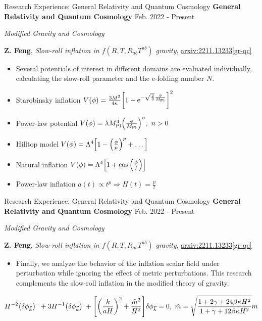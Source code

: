 \documentclass[9pt,aspectratio=169,hyperref=colorlinks]{beamer}
\begin{document}
\begin{frame}{Research Experience: General Relativity and Quantum Cosmology}
    \textbf{General Relativity and Quantum Cosmology} \hfill Feb. 2022 - Present

    \smallskip \quad \textit{Modified Gravity and Cosmology}

    \textbf{Z. Feng}, \textit{Slow-roll inflation in $f\left(R, T, R_{ab}T^{ab}\right)$ gravity}, \href{https://arxiv.org/abs/2211.13233}{arxiv:2211.13233[gr-qc]}

    \begin{itemize}
        \item Several potentials of interest in different domains are evaluated individually, calculating the slow-roll parameter and the e-folding number $N$.
    \end{itemize}

    \begin{itemize}
        \item Starobinsky inflation $V(\phi) = \frac{3 M^2}{4 \kappa} \qty[1 - \mathrm{e}^{- \sqrt{\frac{2}{3}} \frac{\phi}{M_{\text{Pl}}}}]^2$
        \item Power-law potential $V(\phi) = \lambda M_{\text{Pl}}^4 \qty(\frac{\phi}{M_{\text{Pl}}})^n,\ n > 0$
        \item Hilltop model $V(\phi) = \Lambda^4 \qty[1 - \qty(\frac{\phi}{\mu})^p + \dots]$
        \item Natural inflation $V(\phi) = \Lambda^4 \qty[1 + \cos \qty(\frac{\phi}{f})]$
        \item Power-law inflation $a(t) \propto t^p \Rightarrow H(t) = \frac{p}{t}$
    \end{itemize}
\end{frame}

\begin{frame}{Research Experience: General Relativity and Quantum Cosmology}
    \textbf{General Relativity and Quantum Cosmology} \hfill Feb. 2022 - Present

    \smallskip \quad \textit{Modified Gravity and Cosmology}

    \textbf{Z. Feng}, \textit{Slow-roll inflation in $f\left(R, T, R_{ab}T^{ab}\right)$ gravity}, \href{https://arxiv.org/abs/2211.13233}{arxiv:2211.13233[gr-qc]}

    \begin{itemize}
        \item Finally, we analyze the behavior of the inflation scalar field under perturbation while ignoring the effect of metric perturbations. This research complements the slow-roll inflation in the modified theory of gravity.
    \end{itemize}

    \[H^{-2} \qty(\delta \phi_{\vec{k}})^{..} +  3 H^{-1} \qty(\delta \phi_{\vec{k}})^{.} + \qty[ \qty(\frac{k}{a H})^2 + \frac{\tilde{m}^2}{H^2}] \delta \phi_{\vec{k}} = 0,\ \tilde{m} = \sqrt{\frac{1 + 2 \gamma + 24 \beta \kappa H^2}{1 + \gamma + 12 \beta \kappa H^2}} m\]
\end{frame}
\end{document}
